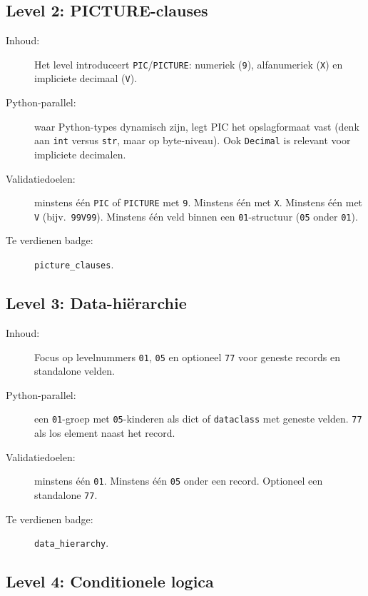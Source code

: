 \subsection{Level 2: PICTURE-clauses}
\label{subsec:poc-level-2}

\begin{description}
    \item[Inhoud:] Het level introduceert \texttt{PIC}/\texttt{PICTURE}: numeriek (\texttt{9}), alfanumeriek (\texttt{X}) en impliciete decimaal (\texttt{V}).
    \item[Python-parallel:] waar Python-types dynamisch zijn, legt PIC het opslagformaat vast (denk aan \texttt{int} versus \texttt{str}, maar op byte-niveau). Ook \texttt{Decimal} is relevant voor impliciete decimalen.
    \item[Validatiedoelen:] minstens één \texttt{PIC} of \texttt{PICTURE} met \texttt{9}. Minstens één met \texttt{X}. Minstens één met \texttt{V} (bijv.\ \texttt{99V99}). Minstens één veld binnen een \texttt{01}-structuur (\texttt{05} onder \texttt{01}).
    \item[Te verdienen badge:] \texttt{picture\_clauses}.
\end{description}

\subsection{Level 3: Data-hiërarchie}
\label{subsec:poc-level-3}

\begin{description}
    \item[Inhoud:] Focus op levelnummers \texttt{01}, \texttt{05} en optioneel \texttt{77} voor geneste records en standalone velden.
    \item[Python-parallel:] een \texttt{01}-groep met \texttt{05}-kinderen als dict of \texttt{dataclass} met geneste velden. \texttt{77} als los element naast het record.
    \item[Validatiedoelen:] minstens één \texttt{01}. Minstens één \texttt{05} onder een record. Optioneel een standalone \texttt{77}.
    \item[Te verdienen badge:] \texttt{data\_hierarchy}.
\end{description}

\subsection{Level 4: Conditionele logica}
\label{subsec:poc-level-4}

